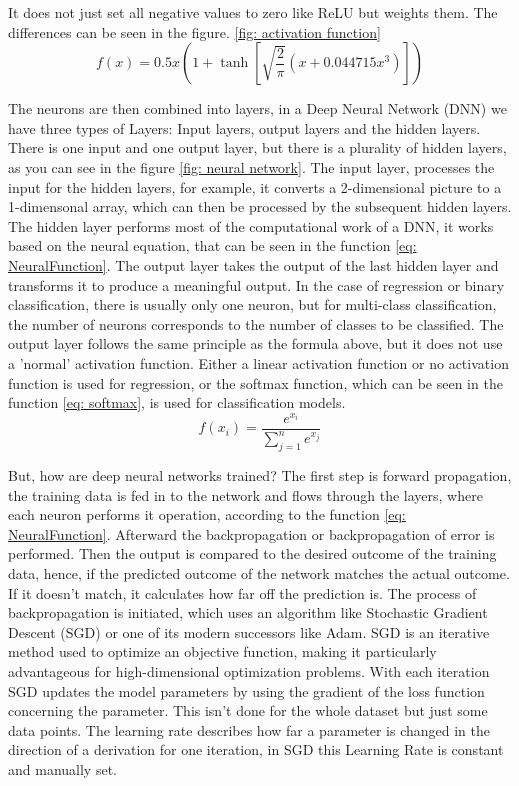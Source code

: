 It does not just set all negative values to zero like ReLU but weights them.
The differences can be seen in the figure. \ref{fig: activation function}
\begin{equation}
    f(x) = 0.5x\left ( 1+\tanh\left [ \sqrt{\frac{2}{\pi}}\left ( x+0.044715x^3 \right ) \right ] \right )
    \label{eq: gelu}
\end{equation}

The neurons are then combined into layers, in a Deep Neural Network (DNN) we have three types of Layers:
Input layers, output layers and the hidden layers.
There is one input and one output layer, but there is a plurality of hidden layers, as you can see in the figure \ref{fig: neural network}.
The input layer, processes the input for the hidden layers, for example, it converts a 2-dimensional picture to a 1-dimensonal array, which can then be processed by the subsequent hidden layers.
The hidden layer performs most of the computational work of a DNN, it works based on the neural equation, that can be seen in the function \ref{eq: NeuralFunction}.
The output layer takes the output of the last hidden layer and transforms it to produce a meaningful output.
In the case of regression or binary classification, there is usually only one neuron, but for multi-class classification, the number of neurons corresponds to the number of classes to be classified.
The output layer follows the same principle as the formula above, but it does not use a 'normal' activation function.
Either a linear activation function or no activation function is used for regression, or the softmax function, which can be seen in the function \ref{eq: softmax}, is used for classification models.
\begin{equation}
    f(x_i) = \frac{e^{x_i}}{\sum^n_{j=1}e^{x_j}}
    \label{eq: softmax}
\end{equation}

But, how are deep neural networks trained? \cite{lecun_deep_2015}
The first step is forward propagation, the training data is fed in to the network and flows through the layers, where each neuron performs it operation, according to the function \ref{eq: NeuralFunction}.
Afterward the backpropagation or backpropagation of error is performed. \cite{rumelhart_learning_1986}
Then the output is compared to the desired outcome of the training data, hence, if the predicted outcome of the network matches the actual outcome.
If it doesn't match, it calculates how far off the prediction is.
The process of backpropagation is initiated, which uses an algorithm like Stochastic Gradient Descent (SGD) or one of its modern successors like Adam.
SGD is an iterative method used to optimize an objective function, making it particularly advantageous for high-dimensional optimization problems.
With each iteration SGD updates the model parameters by using the gradient of the loss function concerning the parameter.
This isn't done for the whole dataset but just some data points.
The learning rate describes how far a parameter is changed in the direction of a derivation for one iteration, in SGD this Learning Rate is constant and manually set.

